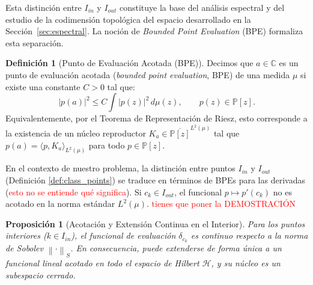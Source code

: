 \documentclass[12pt,a4paper]{article}
\newtheorem{proposition}{Proposición}
\theoremstyle{definition}
\newtheorem{definition}{Definición}
\theoremstyle{remark}
\newcommand{\C}{\mathbb{C}}
\newcommand{\norm}[1]{\left\| #1 \right\|_S}
\newcommand{\abs}[1]{\left| #1 \right|}
\begin{document}
Esta distinción entre $I_{in}$ y $I_{out}$ constituye la base del análisis espectral y del estudio de la codimensión topológica del espacio desarrollado en la Sección~\ref{sec:espectral}. La noción de \textit{Bounded Point Evaluation} (BPE) formaliza esta separación.

\begin{definition}[Punto de Evaluación Acotada (BPE)]
	Decimos que $a \in \C$ es un punto de evaluación acotada (\textit{bounded point evaluation}, BPE) de una medida $\mu$ \cite{miller1999bounded,aleman2009nontangential} si existe una constante $C > 0$ tal que:
	\begin{equation}
		\abs{p(a)}^2 \leq C \int \abs{p(z)}^2 \, d\mu(z), \qquad p(z) \in \mathbb{P}[z].
	\end{equation}
	Equivalentemente, por el Teorema de Representación de Riesz, esto corresponde a la existencia de un núcleo reproductor $K_a \in \overline{\mathbb{P}[z]}^{L^2(\mu)}$ tal que $p(a) = \langle p, K_a \rangle_{L^2(\mu)}$ para todo $p \in \mathbb{P}[z]$.
\end{definition}

En el contexto de nuestro problema, la distinción entre puntos $I_{in}$ y $I_{out}$ (Definición \ref{def:class_points}) se traduce en términos de BPEs para las derivadas (\textcolor{red}{esto no se entiende qué significa}). Si $c_k \in I_{out}$, el funcional $p \mapsto p'(c_k)$ no es acotado en la norma estándar $L^2(\mu)$. \textcolor{red}{tienes que poner la DEMOSTRACIÓN }

\begin{proposition}[Acotación y Extensión Continua en el Interior]
	Para los puntos interiores ($k \in I_{in}$), el funcional de evaluación $\delta_{c_k}$ es continuo respecto a la norma de Sobolev $\norm{\cdot}$. En consecuencia, puede extenderse de forma única a un funcional lineal acotado en todo el espacio de Hilbert $\mathcal{H}$, y su núcleo es un subespacio cerrado.
\end{proposition}
\end{document}
